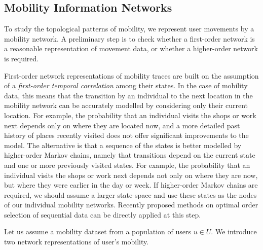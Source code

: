 

\subsection{Mobility Information Networks\label{sec:mobility-networks}}

To study the topological patterns of mobility, we represent user movements by a mobility network.
A preliminary step is to check whether a first-order network is a reasonable representation of movement data, or whether a higher-order network is required.

First-order network representations of mobility traces are built on the assumption of a \emph{first-order temporal correlation} among their states.
In the case of mobility data, this means that the transition by an individual to the next location in the mobility network can be accurately modelled by considering only their current location.
For example, the probability that an individual visits the shops or work next depends only on where they are located now, and a more detailed past history of places recently visited does not offer significant improvements to the model.
The alternative is that a sequence of the states is better modelled by higher-order Markov chains, namely that transitions depend on the current state and one or more previously visited states.
For example, the probability that an individual visits the shops or work next depends not only on where they are now, but where they were earlier in the day or week.
If higher-order Markov chains are required, we should assume a larger state-space and use these states as the nodes of our individual mobility networks.
Recently proposed methods on optimal order selection of sequential data \cite{xu2016representing, scholtes2017network} can be directly applied at this step.

Let us assume a mobility dataset from a population of users $ u \in U$.
We introduce two network representations of user's mobility.


